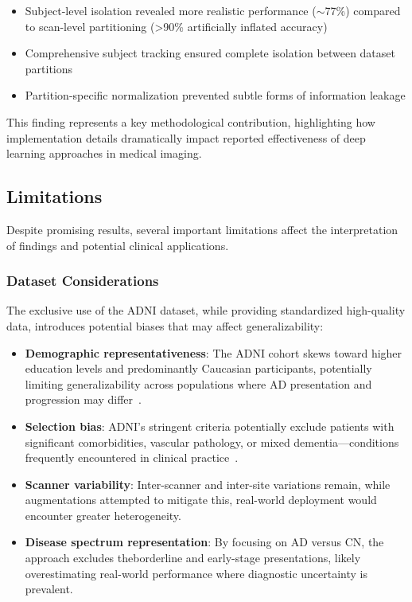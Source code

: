\documentclass[12pt, a4paper]{article}
\begin{document}
\begin{itemize}
    \item Subject-level isolation revealed more realistic performance ($\sim$77\%) compared to scan-level partitioning (>90\% artificially inflated accuracy)
    \item Comprehensive subject tracking ensured complete isolation between dataset partitions
    \item Partition-specific normalization prevented subtle forms of information leakage
\end{itemize}

This finding represents a key methodological contribution, highlighting how implementation details dramatically impact reported effectiveness of deep learning approaches in medical imaging.

\subsection{Limitations}

Despite promising results, several important limitations affect the interpretation of findings and potential clinical applications.

\subsubsection{Dataset Considerations}

The exclusive use of the ADNI dataset, while providing standardized high-quality data, introduces potential biases that may affect generalizability:

\begin{itemize}
    \item \textbf{Demographic representativeness}: The ADNI cohort skews toward higher education levels and predominantly Caucasian participants, potentially limiting generalizability across populations where AD presentation and progression may differ~\cite{jack2008alzheimer}.
    
    \item \textbf{Selection bias}: ADNI's stringent criteria potentially exclude patients with significant comorbidities, vascular pathology, or mixed dementia—conditions frequently encountered in clinical practice~\cite{jack2008alzheimer}.
    
    \item \textbf{Scanner variability}: Inter-scanner and inter-site variations remain, while augmentations attempted to mitigate this, real-world deployment would encounter greater heterogeneity.
    
    \item \textbf{Disease spectrum representation}: By focusing on AD versus CN, the approach excludes theborderline and early-stage presentations, likely overestimating real-world performance where diagnostic uncertainty is prevalent.
\end{itemize}
\end{document}
